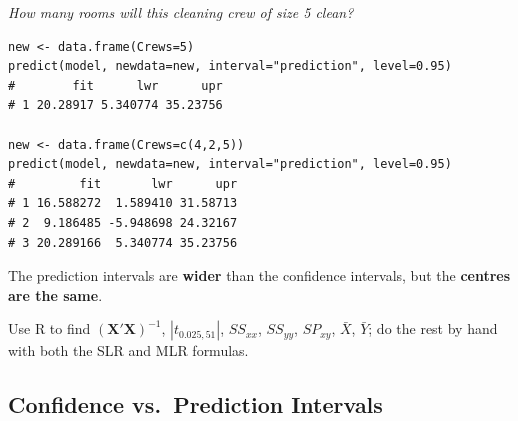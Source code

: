 \begin{example}
    \textit{How many rooms will this cleaning crew of size 5 clean?}
\begin{verbatim}
new <- data.frame(Crews=5)
predict(model, newdata=new, interval="prediction", level=0.95)
#        fit      lwr      upr
# 1 20.28917 5.340774 35.23756

new <- data.frame(Crews=c(4,2,5))
predict(model, newdata=new, interval="prediction", level=0.95)
#         fit       lwr      upr
# 1 16.588272  1.589410 31.58713
# 2  9.186485 -5.948698 24.32167
# 3 20.289166  5.340774 35.23756
\end{verbatim}
    The prediction intervals are \textbf{wider} than the confidence intervals, but the
    \textbf{centres are the same}.
\end{example}

\begin{exercise}
    Use R to find $(\mathbf{X}'\mathbf{X})^{-1}$, $|t_{0.025,51}|$, $SS_{xx}$, $SS_{yy}$,
    $SP_{xy}$, $\bar X$, $\bar Y$; do the rest by hand with both the SLR and MLR formulas.
    \\
\end{exercise}

\subsection{Confidence vs.\ Prediction Intervals}


